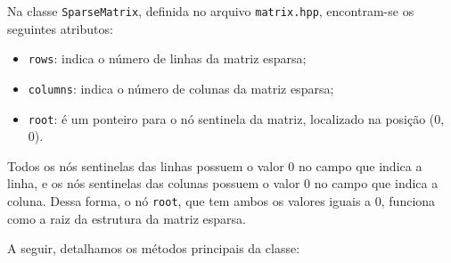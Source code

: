 \documentclass[12pt]{article}
\begin{document}
Na classe \verb|SparseMatrix|, definida no arquivo \verb|matrix.hpp|, encontram-se os seguintes atributos:

\begin{itemize}
    \item \verb|rows|: indica o número de linhas da matriz esparsa;
    \item \verb|columns|: indica o número de colunas da matriz esparsa;
    \item \verb|root|: é um ponteiro para o nó sentinela da matriz, localizado na posição (0, 0).
\end{itemize}

Todos os nós sentinelas das linhas possuem o valor 0 no campo que indica a linha, e os nós sentinelas das colunas possuem o valor 0 no campo que indica a coluna. Dessa forma, o nó \verb|root|, que tem ambos os valores iguais a 0, funciona como a raiz da estrutura da matriz esparsa.

A seguir, detalhamos os métodos principais da classe:
\end{document}
